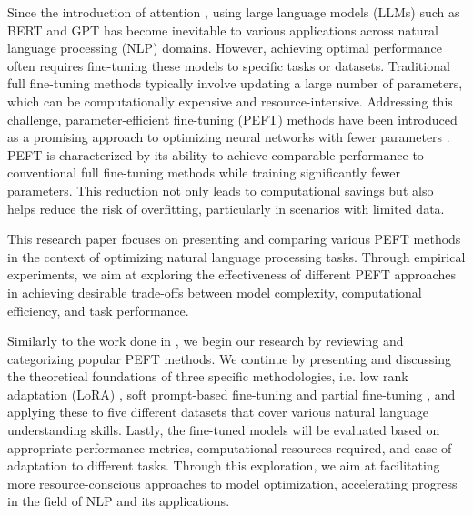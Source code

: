 Since the introduction of attention \cite{vaswani2017attention}, using large language models (LLMs) such as BERT \cite{devlin2019bert} and GPT \cite{radford2018gpt} has become inevitable to various applications across natural language processing (NLP) domains. However, achieving optimal performance often requires fine-tuning these models to specific tasks or datasets. Traditional full fine-tuning methods typically involve updating a large number of parameters, which can be computationally expensive and resource-intensive. Addressing this challenge, parameter-efficient fine-tuning (PEFT) methods have been introduced as a promising approach to optimizing neural networks with fewer parameters \cite{xu2023parameterefficient}. PEFT is characterized by its ability to achieve comparable performance to conventional full fine-tuning methods while training significantly fewer parameters. This reduction not only leads to computational savings but also helps reduce the risk of overfitting, particularly in scenarios with limited data.

This research paper focuses on presenting and comparing various PEFT methods in the context of optimizing natural language processing tasks. Through empirical experiments, we aim at exploring the effectiveness of different PEFT approaches in achieving desirable trade-offs between model complexity, computational efficiency, and task performance.

\noindent Similarly to the work done in \cite{xu2023parameterefficient}, we begin our research by reviewing and categorizing popular PEFT methods. We continue by presenting and discussing the theoretical foundations of three specific methodologies, i.e. low rank adaptation (LoRA) \cite{hu2021lora}, soft prompt-based fine-tuning \cite{lester2021power} and partial fine-tuning \cite{zaken2022bitfit}, and applying these to five different datasets that cover various natural language understanding skills. Lastly, the fine-tuned models will be evaluated based on appropriate performance metrics, computational resources required, and ease of adaptation to different tasks. Through this exploration, we aim at facilitating more resource-conscious approaches to model optimization, accelerating progress in the field of NLP and its applications.